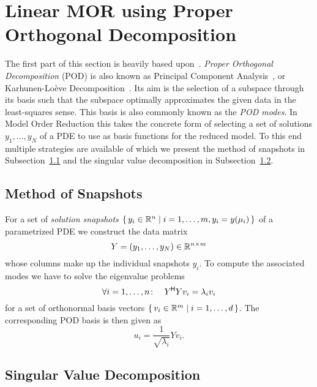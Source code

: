 \section{Linear MOR using Proper Orthogonal Decomposition}\label{sec:pod}

The first part of this section is heavily based upon~\cite{Pinnau2008}.
\emph{Proper Orthogonal Decomposition} (POD) is also known as Principal Component Analysis~\cite{Hotelling1936}, or Karhunen-Loève Decomposition~\cite{Karhunen1946}.
Its aim is the selection of a subspace through its basis such that the subspace optimally approximates the given data in the least-squares sense.
This basis is also commonly known as the \emph{POD modes}.
In Model Order Reduction this takes the concrete form of selecting a set of solutions $y_1, \dots, y_N$ of a PDE to use as basis functions for the reduced model.
To this end multiple strategies are available of which we present the method of snapshots in Subsection~\ref{subsec:pod-snapshots} and the singular value decomposition in Subsection~\ref{subsec:pod-svd}.

\subsection{Method of Snapshots}\label{subsec:pod-snapshots}

For a set of \emph{solution snapshots} $\left\{\,y_i \in \mathbb{R}^n\mid i = 1, \dots, m, y_i = y(\mu_i)\,\right\}$ of a parametrized PDE we construct the data matrix
\begin{equation}\label{eq:pod-data-matrix}
    Y = \left( y_1, \dots, y_N \right) \in \mathbb{R}^{n \times m}
\end{equation}
whose columns make up the individual snapshots $y_i$.
To compute the associated modes we have to solve the eigenvalue problems
\begin{equation*}
    \forall i = 1, \dots, n \colon\quad Y^{\mkern-1.5mu \mathsf{H}} Y v_i = \lambda_i v_i
\end{equation*}
for a set of orthonormal basis vectors $\left\{\,v_i \in \mathbb{R}^m\mid i = 1, \dots, d\,\right\}$.
The corresponding POD basis is then given as
\begin{equation*}
    u_i = \frac{1}{\sqrt{\lambda_i}} Y v_i.
\end{equation*}

\subsection{Singular Value Decomposition}\label{subsec:pod-svd}

